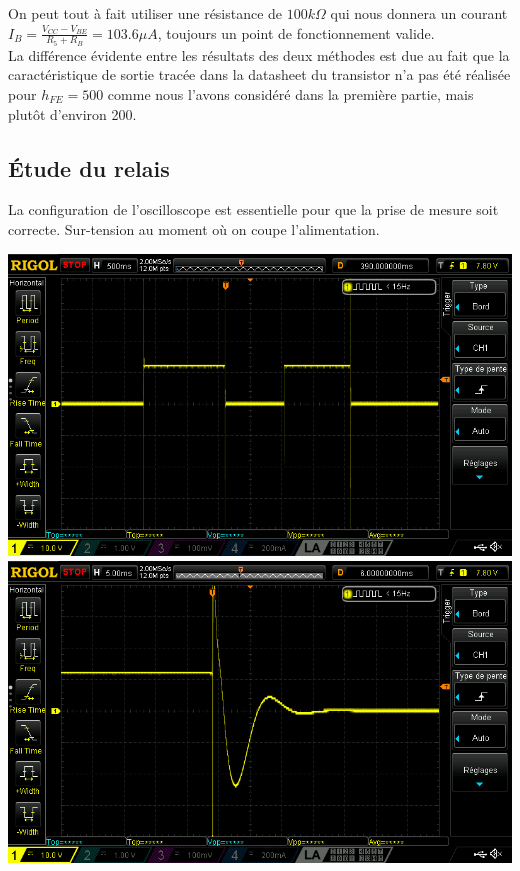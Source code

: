 \documentclass{../../template/labo}
\begin{document}
{	On peut tout à fait utiliser une résistance de $100 k\Omega$ qui nous donnera un courant $I_B = \frac{V_{CC} - V_{BE}}{R_5 + R_B} = 103.6 \mu A$, toujours un point de fonctionnement valide.\\

	La différence évidente entre les résultats des deux méthodes est due au fait que la caractéristique de sortie tracée dans la datasheet du transistor n'a pas été réalisée pour $h_{FE} = 500$ comme nous l'avons considéré dans la première partie, mais plutôt d'environ 200.
}




\subsection{Étude du relais}
{
	La configuration de l'oscilloscope est essentielle pour que la prise de mesure soit correcte.
	Sur-tension au moment où on coupe l'alimentation.
	\begin{center}
		\includegraphics[width=.8\textwidth]{DS1Z_QuickPrint2.png}\\
		\includegraphics[width=.8\textwidth]{DS1Z_QuickPrint1.png}
	\end{center}
}
\end{document}
